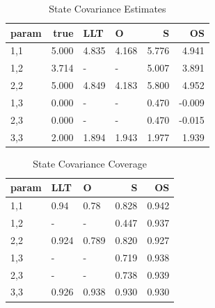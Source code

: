 \documentclass[
]{article}
\begin{document}
\begin{longtable}[t]{l|r|l|l|r|r}
\caption{\label{tab:unnamed-chunk-24}State Covariance Estimates}\\
\hline
param & true & LLT & O & S & OS\\
\hline
1,1 & 5.000 & 4.835 & 4.168 & 5.776 & 4.941\\
\hline
1,2 & 3.714 & - & - & 5.007 & 3.891\\
\hline
2,2 & 5.000 & 4.849 & 4.183 & 5.800 & 4.952\\
\hline
1,3 & 0.000 & - & - & 0.470 & -0.009\\
\hline
2,3 & 0.000 & - & - & 0.470 & -0.015\\
\hline
3,3 & 2.000 & 1.894 & 1.943 & 1.977 & 1.939\\
\hline
\end{longtable}

\begin{longtable}[t]{l|l|l|r|r}
\caption{\label{tab:unnamed-chunk-25}State Covariance Coverage}\\
\hline
param & LLT & O & S & OS\\
\hline
1,1 & 0.94 & 0.78 & 0.828 & 0.942\\
\hline
1,2 & - & - & 0.447 & 0.937\\
\hline
2,2 & 0.924 & 0.789 & 0.820 & 0.927\\
\hline
1,3 & - & - & 0.719 & 0.938\\
\hline
2,3 & - & - & 0.738 & 0.939\\
\hline
3,3 & 0.926 & 0.938 & 0.930 & 0.930\\
\hline
\end{longtable}
\end{document}
